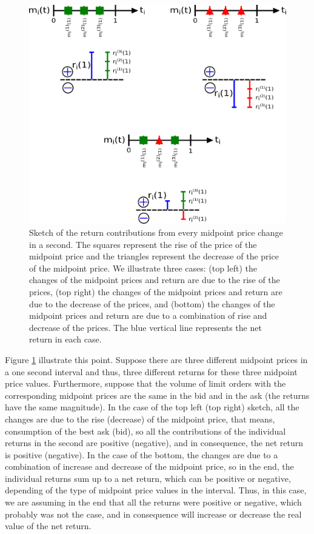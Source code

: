 \begin{figure}[htbp]
    \centering
    \includegraphics[width=\columnwidth]{figures/02_return_contributions.png}
    \caption{Sketch of the return contributions from every midpoint price
             change in a second. The squares represent the rise of the price of
             the midpoint price and the triangles represent the decrease of the
             price of the midpoint price. We illustrate three cases: (top left)
             the changes of the midpoint prices and return are due to the rise
             of the prices, (top right) the changes of the midpoint prices and
             return are due to the decrease of the prices, and (bottom) the
             changes of the midpoint prices and return are due to a combination
             of rise and decrease of the prices. The blue vertical line
             represents the net return in each case.}
    \label{fig:return_contributions}
\end{figure}

Figure \ref{fig:return_contributions} illustrate this point. Suppose there are
three different midpoint prices in a one second interval and thus, three
different returns for these three midpoint price values. Furthermore, suppose
that the volume of limit orders with the corresponding midpoint prices are the
same in the bid and in the ask (the returns have the same magnitude). In the
case of the top left (top right) sketch, all the changes are due to the rise
(decrease) of the midpoint price, that means, consumption of the best ask
(bid), so all the contributions of the individual returns in the second are
positive (negative), and in consequence, the net return is positive (negative).
In the case of the bottom, the changes are due to a combination of increase and
decrease of the midpoint price, so in the end, the individual returns sum up to
a net return, which can be positive or negative, depending of the type of
midpoint price values in the interval. Thus, in this case, we are assuming in
the end that all the returns were positive or negative, which probably was not
the case, and in consequence will increase or decrease the real value of the
net return.

